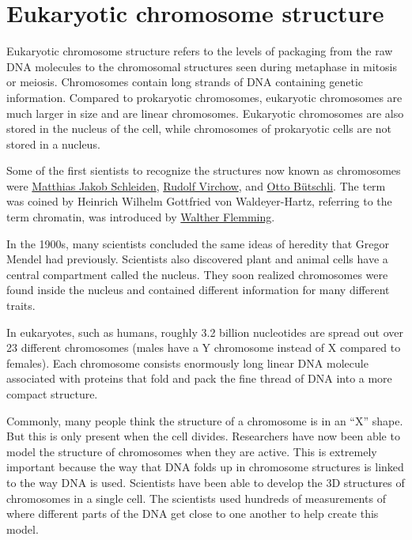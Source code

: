 \chapter{Eukaryotic chromosome structure}\label{eukaryotic-chromosome-structure}

Eukaryotic chromosome structure refers to the levels of packaging from the raw DNA molecules to the chromosomal structures seen during metaphase in mitosis or meiosis. Chromosomes contain long strands of DNA containing genetic information. Compared to prokaryotic chromosomes, eukaryotic chromosomes are much larger in size and are linear chromosomes. Eukaryotic chromosomes are also stored in the nucleus of the cell, while chromosomes of prokaryotic cells are not stored in a nucleus.

Some of the first sientists to recognize the structures now known as chromosomes were \href{https://en.wikipedia.org/wiki/Matthias_Jakob_Schleiden}{Matthias Jakob Schleiden}, \href{https://en.wikipedia.org/wiki/Rudolf_Virchow}{Rudolf Virchow}, and \href{https://en.wikipedia.org/wiki/Otto_B\%C3\%BCtschli}{Otto Bütschli}. The term was coined by Heinrich Wilhelm Gottfried von Waldeyer-Hartz, referring to the term chromatin, was introduced by \href{https://en.wikipedia.org/wiki/Walther_Flemming}{Walther Flemming}.

In the 1900s, many scientists concluded the same ideas of heredity that Gregor Mendel had previously. Scientists also discovered plant and animal cells have a central compartment called the nucleus. They soon realized chromosomes were found inside the nucleus and contained different information for many different traits.

In eukaryotes, such as humans, roughly 3.2 billion nucleotides are spread out over 23 different chromosomes (males have a Y chromosome instead of X compared to females). Each chromosome consists enormously long linear DNA molecule associated with proteins that fold and pack the fine thread of DNA into a more compact structure.

Commonly, many people think the structure of a chromosome is in an ``X'' shape. But this is only present when the cell divides. Researchers have now been able to model the structure of chromosomes when they are active. This is extremely important because the way that DNA folds up in chromosome structures is linked to the way DNA is used. Scientists have been able to develop the 3D structures of chromosomes in a single cell. The scientists used hundreds of measurements of where different parts of the DNA get close to one another to help create this model.

